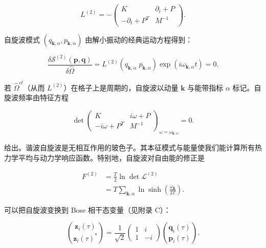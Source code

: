 \begin{equation*}
L ^ {(2)} = - \left( \begin{array}{cc} K & \partial_ {t} + P \\ - \partial_ {t} + P ^ {T} & M ^ {- 1} \end{array} \right).
\tag{11.12}
\end{equation*}

自旋波模式 $(q_{\mathbf{k},\alpha}, p_{\mathbf{k},\alpha})$ 由解小振动的经典运动方程得到：

\begin{equation*}
\frac {\delta \mathcal {S} ^ {(2)} ( \mathbf {p}, \mathbf {q} )}{\delta \hat {\Omega}} = L ^ {(2)} \left( q _ {\mathbf {k}, \alpha} \; p _ {\mathbf {k}, \alpha} \right) \exp \left( i \omega_ {\mathbf {k}, \alpha} t \right) = 0.
\tag{11.13}
\end{equation*}

若 $\hat{\Omega}^{cl}$（从而 $L^{(2)}$）在格子上是周期的，自旋波以动量 $\mathbf{k}$ 与能带指标 $\alpha$ 标记。自旋波频率由特征方程

\begin{equation*}
\det \left( \begin{array}{cc} K & i \omega + P \\ - i \omega + P ^ {T} & M ^ {- 1} \end{array} \right)_{\omega = \omega_ {\mathbf {k}, \alpha}} = 0.
\tag{11.14}
\end{equation*}

给出。谐波自旋波是无相互作用的玻色子。其本征模式与能量使我们能计算所有热力学平均与动力学响应函数。特别地，自旋波对自由能的修正是

\begin{align*}
F ^ {(2)} & = \frac {T}{2} \ln \det \mathcal {L} ^ {(2)}\\
& = T \sum_ {\mathbf {k}, \alpha} \ln \sinh \left( \frac {\omega_ {\mathbf {k}}}{2 T} \right) .
\tag{11.15}
\end{align*}

可以把自旋波变换到 Bose 相干态变量（见附录 C）：

\begin{equation*}
\binom{\mathbf {z} _ {i} ( \tau )}{\mathbf {z} _ {i} ( \tau ) ^ {*}} = \frac {1}{\sqrt {2}} \left( \begin{array}{cc} 1 & i \\ 1 & - i \end{array} \right) \binom{\mathbf {q} _ {i} ( \tau )}{\mathbf {p} _ {i} ( \tau )}.
\tag{11.16}
\end{equation*}

